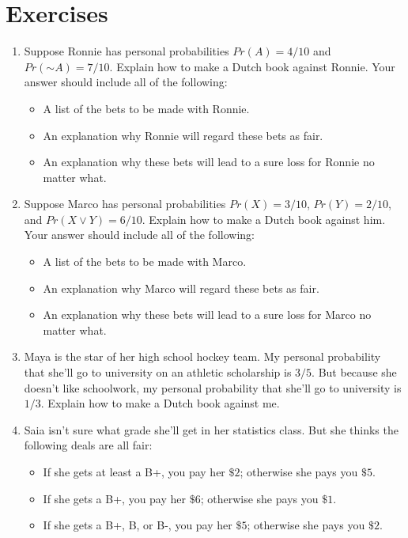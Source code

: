 \documentclass[justified]{tufte-book}
\providecommand{\tightlist}{%
  \setlength{\itemsep}{0pt}\setlength{\parskip}{0pt}}
\renewcommand{\neg}{\mathbin{\sim}}
\newcommand{\p}{Pr}
\theoremstyle{definition}
\theoremstyle{definition}
\theoremstyle{definition}
\theoremstyle{definition}
\theoremstyle{remark}
\begin{document}
\hypertarget{exercises-15}{%
\section*{Exercises}\label{exercises-15}}

\begin{enumerate}
\item
  Suppose Ronnie has personal probabilities \(\p(A) = 4/10\) and \(\p(\neg A) = 7/10\). Explain how to make a Dutch book against Ronnie. Your answer should include all of the following:

  \begin{itemize}
  \tightlist
  \item
    A list of the bets to be made with Ronnie.
  \item
    An explanation why Ronnie will regard these bets as fair.
  \item
    An explanation why these bets will lead to a sure loss for Ronnie no matter what.
  \end{itemize}
\item
  Suppose Marco has personal probabilities \(\p(X) = 3/10\), \(\p(Y) = 2/10\), and \(\p(X \vee Y) = 6/10\). Explain how to make a Dutch book against him. Your answer should include all of the following:

  \begin{itemize}
  \tightlist
  \item
    A list of the bets to be made with Marco.
  \item
    An explanation why Marco will regard these bets as fair.
  \item
    An explanation why these bets will lead to a sure loss for Marco no matter what.
  \end{itemize}
\item
  Maya is the star of her high school hockey team. My personal probability that she'll go to university on an athletic scholarship is \(3/5\). But because she doesn't like schoolwork, my personal probability that she'll go to university is \(1/3\). Explain how to make a Dutch book against me.
\item
  Saia isn't sure what grade she'll get in her statistics class. But she thinks the following deals are all fair:

  \begin{itemize}
  \tightlist
  \item
    If she gets at least a B+, you pay her \(\$2\); otherwise she pays you \(\$5\).
  \item
    If she gets a B+, you pay her \(\$6\); otherwise she pays you \(\$1\).
  \item
    If she gets a B+, B, or B-, you pay her \(\$5\); otherwise she pays you \(\$2\).
  \end{itemize}


\end{enumerate}
\end{document}

